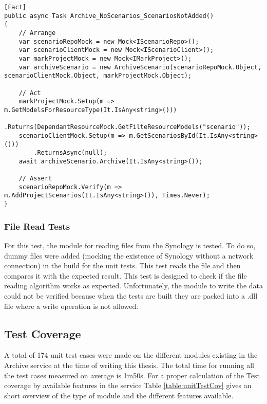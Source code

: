 \begin{lstlisting}[language={[Sharp]C}, caption={No scenarios added if resource empty}, captionpos=b,label={lst:scenarisEmpty}]
[Fact]
public async Task Archive_NoScenarios_ScenariosNotAdded()
{
    // Arrange
    var scenarioRepoMock = new Mock<IScenarioRepo>();
    var scenarioClientMock = new Mock<IScenarioClient>();
    var markProjectMock = new Mock<IMarkProject>();
    var archiveScenario = new ArchiveScenario(scenarioRepoMock.Object, scenarioClientMock.Object, markProjectMock.Object);
    
    // Act
    markProjectMock.Setup(m => m.GetModelsForResourceType(It.IsAny<string>()))
        .Returns(DependantResourceMock.GetFilteResourceModels("scenario"));
    scenarioClientMock.Setup(m => m.GetScenariosById(It.IsAny<string>()))
        .ReturnsAsync(null);
    await archiveScenario.Archive(It.IsAny<string>());                
    
    // Assert
    scenarioRepoMock.Verify(m => m.AddProjectScenarios(It.IsAny<string>()), Times.Never);
}
\end{lstlisting}

\subsubsection{File Read Tests}
For this test, the module for reading files from the Synology is tested. To do so, dummy files were added (mocking the existence of Synology without 
a network connection) in the build for the unit tests. This test reads the file
and then compares it with the expected result. This test is designed to check if the file reading algorithm works as expected. Unfortunately, the module to write the data
could not be verified because when the tests are built they are packed into a .dll file where a write operation is not allowed.

\subsection{Test Coverage}
A total of 174 unit test cases were made on the different modules existing in the Archive service at the time of writing this thesis. The total time for running all 
the test cases measured on average is 1m50s. For a proper calculation of the Test coverage by available features in the service Table \ref{table:unitTestCov} gives an short
overview of the type of module and the different features available.


